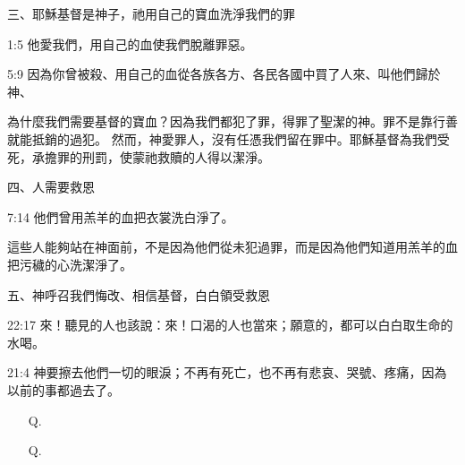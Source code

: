 \begin{center}
\begin{tcolorbox}
\vspace{0.3cm}
三、耶穌基督是神子，祂用自己的寶血洗淨我們的罪
\begin{ScriptureBox}
\item[1:5]他愛我們，用自己的血使我們脫離罪惡。
\item[5:9]因為你曾被殺、用自己的血從各族各方、各民各國中買了人來、叫他們歸於　神、
\end{ScriptureBox}
為什麼我們需要基督的寶血？因為我們都犯了罪，得罪了聖潔的神。罪不是靠行善就能抵銷的過犯。
然而，神愛罪人，沒有任憑我們留在罪中。耶穌基督為我們受死，承擔罪的刑罰，使蒙祂救贖的人得以潔淨。

\vspace{0.3cm}
四、人需要救恩
\begin{ScriptureBox}
\item[7:14]他們曾用羔羊的血把衣裳洗白淨了。
\end{ScriptureBox}
這些人能夠站在神面前，不是因為他們從未犯過罪，而是因為他們知道用羔羊的血把污穢的心洗潔淨了。

\vspace{0.3cm}
五、神呼召我們悔改、相信基督，白白領受救恩
\begin{ScriptureBox}
\item[22:17] 來！聽見的人也該說：來！口渴的人也當來；願意的，都可以白白取生命的水喝。
\item[21:4] 神要擦去他們一切的眼淚；不再有死亡，也不再有悲哀、哭號、疼痛，因為以前的事都過去了。
\end{ScriptureBox}

\begin{itemize}[leftmargin=2em, labelsep=0.3em]
\item[Q.] 
\item[Q.] 
\end{itemize}

\end{tcolorbox}
\end{center}


